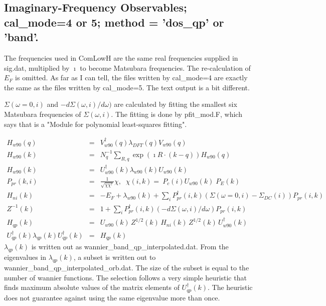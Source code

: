 \documentclass[aps,prb,singlecolumn,preprintnumbers,amsmath,amssymb]{revtex4}
\begin{document}
 \subsection{Imaginary-Frequency Observables; cal\_mode=4 or 5; method = 'dos\_qp' or 'band'.}
The frequencies used in ComLowH are the same real frequencies supplied in sig.dat, multiplied by $\imath$ to become Matsubara frequencies.  The re-calculation of $E_F$ is omitted.  As far as I can tell, the files written by cal\_mode=4 are exactly the same as the files written by cal\_mode=5.  The text output is a bit different.

$\Sigma(\omega=0,i)$ and $-d\Sigma(\omega,i)/d\omega)$ are calculated by fitting the smallest six Matsubara frequencies of $\Sigma(\omega,i)$.  The fitting is done by pfit\_mod.F, which says that is a "Module for polynomial least-squares fitting".

\begin{eqnarray}
H_{w90}(q) &=&  V_{w90}^\dagger(q) \lambda_{DFT}(q) V_{w90}(q)  \nonumber \\ %
H_{w90}(k) &=& N_q^{-1} \sum_{R,q} \exp(\imath R \cdot (k -q)) H_{w90}(q)  \nonumber \\
 H_{w90}(k) & = &U_{w90}^\dagger(k) \lambda_{w90}(k) U_{w90}(k)  \nonumber  \\
P_{pr}(k,i) & = & \frac{1}{\sqrt{\chi \chi^\dagger}} \chi ,  \;\;\chi(i,k) = \ P_c(i) U_{w90}(k)\; P_E(k)  \nonumber \\ 
H_{ni}( k) &=& -E_F  + \lambda_{w90}(k)  + \sum_i P_{pr}^\dagger(i,k) (\Sigma(\omega=0,i) - \Sigma_{DC}(i) )  P_{pr}(i,k) \nonumber    \\ 
Z^{-1} (k)  &=&  1 + \sum_i P_{pr}^\dagger(i,k) (-d\Sigma(\omega,i)/d\omega)  P_{pr}(i,k) \nonumber \\
H_{qp}(k) &=& U_{w90}(k) \, Z^{1/2}(k) \, H_{ni}( k) \, Z^{1/2}(k) \, U_{w90}^\dagger(k) \nonumber  \\
U_{qp}^\dagger(k) \lambda_{qp}(k) U_{qp}^\dagger(k) &=& H_{qp}(k) \nonumber
\end{eqnarray}
$\lambda_{qp}(k)$ is written out as wannier\_band\_qp\_interpolated.dat.  From the eigenvalues in $\lambda_{qp}(k)$, a subset is written out to wannier\_band\_qp\_interpolated\_orb.dat. The size of the subset is equal to the number of wannier functions.  The selection follows a very simple heuristic that finds maximum absolute values of  the matrix elements of $U_{qp}^\dagger(k)$.  The heuristic does not guarantee against using the same eigenvalue more than once.
\end{document}
